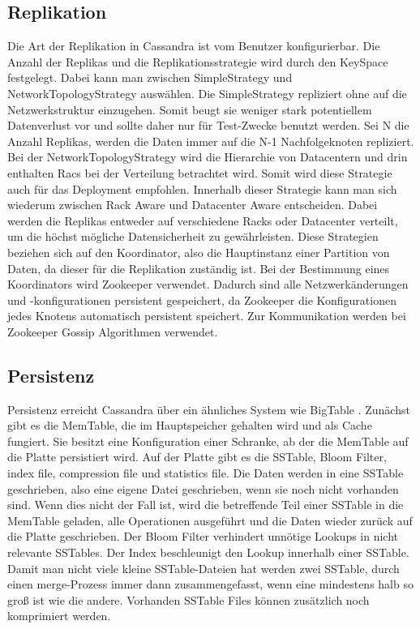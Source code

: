 \subsection{Replikation}
Die Art der Replikation in Cassandra ist vom Benutzer konfigurierbar. Die Anzahl der Replikas und die Replikationsstrategie wird durch den KeySpace festgelegt. Dabei kann man zwischen SimpleStrategy und NetworkTopologyStrategy auswählen. Die SimpleStrategy repliziert ohne auf die Netzwerkstruktur einzugehen. Somit beugt sie weniger stark potentiellem Datenverlust vor und sollte daher nur für Test-Zwecke benutzt werden. Sei N die Anzahl Replikas, werden die Daten immer auf die N-1 Nachfolgeknoten repliziert. Bei der NetworkTopologyStrategy wird die Hierarchie von Datacentern und drin enthalten Racs bei der Verteilung betrachtet wird. Somit wird diese Strategie auch für das Deployment empfohlen. Innerhalb dieser Strategie kann man sich wiederum zwischen Rack Aware und Datacenter Aware entscheiden. Dabei werden die Replikas entweder auf verschiedene Racks oder Datacenter verteilt, um die höchst mögliche Datensicherheit zu gewährleisten. Diese Strategien beziehen sich auf den Koordinator, also die Hauptinstanz einer Partition von Daten, da dieser für die Replikation zuständig ist.
Bei der Bestimmung eines Koordinators wird Zookeeper verwendet. Dadurch sind alle Netzwerkänderungen und -konfigurationen persistent gespeichert, da Zookeeper die Konfigurationen jedes Knotens automatisch persistent speichert. Zur Kommunikation werden bei Zookeeper Gossip Algorithmen verwendet.

\subsection{Persistenz}
Persistenz erreicht Cassandra über ein ähnliches System wie BigTable \cite{bigtable}. Zunächst gibt es die MemTable, die im Hauptspeicher gehalten wird und als Cache fungiert. Sie besitzt eine Konfiguration einer Schranke, ab der die MemTable auf die Platte persistiert wird. Auf der Platte gibt es die SSTable, Bloom Filter, index file, compression file und statistics file. Die Daten werden in eine SSTable geschrieben, also eine eigene Datei geschrieben, wenn sie noch nicht vorhanden sind. Wenn dies nicht der Fall ist, wird die betreffende Teil einer SSTable in die MemTable geladen, alle Operationen ausgeführt und die Daten wieder zurück auf die Platte geschrieben. Der Bloom Filter verhindert unnötige Lookups in nicht relevante SSTables. Der Index beschleunigt den Lookup innerhalb einer SSTable. Damit man nicht viele kleine SSTable-Dateien hat werden zwei SSTable, durch einen merge-Prozess immer dann zusammengefasst, wenn eine mindestens halb so groß ist wie die andere. Vorhanden SSTable Files können zusätzlich noch komprimiert werden.

